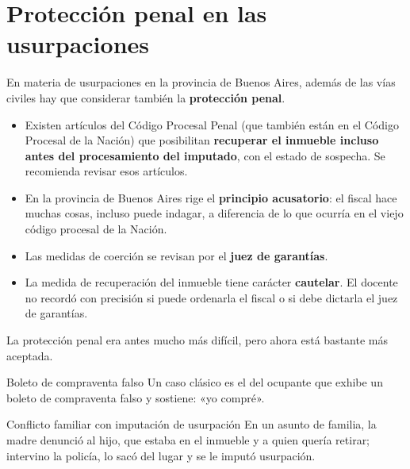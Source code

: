 \documentclass[12pt,oneside]{book}
\begin{document}
\section{Protección penal en las usurpaciones}

En materia de usurpaciones en la provincia de Buenos Aires, además de las vías civiles hay que considerar también la \textbf{protección penal}.

\begin{itemize}
    \item Existen artículos del Código Procesal Penal (que también están en el Código Procesal de la Nación) que posibilitan \textbf{recuperar el inmueble incluso antes del procesamiento del imputado}, con el estado de sospecha. Se recomienda revisar esos artículos.
    \item En la provincia de Buenos Aires rige el \textbf{principio acusatorio}: el fiscal hace muchas cosas, incluso puede indagar, a diferencia de lo que ocurría en el viejo código procesal de la Nación.
    \item Las medidas de coerción se revisan por el \textbf{juez de garantías}.
    \item La medida de recuperación del inmueble tiene carácter \textbf{cautelar}. El docente no recordó con precisión si puede ordenarla el fiscal o si debe dictarla el juez de garantías.
\end{itemize}

La protección penal era antes mucho más difícil, pero ahora está bastante más aceptada.

\begin{example}{Boleto de compraventa falso}
Un caso clásico es el del ocupante que exhibe un boleto de compraventa falso y sostiene: «yo compré».
\end{example}

\begin{example}{Conflicto familiar con imputación de usurpación}
En un asunto de familia, la madre denunció al hijo, que estaba en el inmueble y a quien quería retirar; intervino la policía, lo sacó del lugar y se le imputó usurpación.
\end{example}
\end{document}
